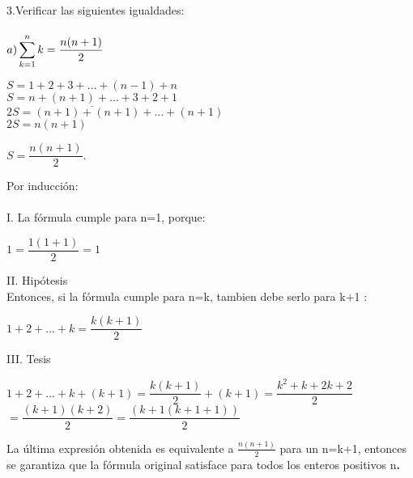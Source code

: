 \documentclass[12pt,a4paper,scrartcl]{article}
\begin{document}
{\newpage
3.Verificar las siguientes igualdades:\\
\\
$
\displaystyle
a)  \sum_{k=1}^{n}k = \dfrac{n(n+1)}{2} \\
$
\begin{center}
$S=1+2+3+\ldots+(n-1)+n$\\$\underline{S=n+(n+1)+\ldots+3+2+1}$\\$2S=(n+1)+(n+1)+\ldots+(n+1)$\\\vspace{1em}
$2S=n(n+1)$\\\vspace{1em}
\begin{center}
$S=\dfrac{n(n+1)}{2}\textbf{.}$
\end{center}
\end{center}Por inducci\'on:\\
\\I. La f\'ormula cumple para n=1, porque:\\
\begin{center}
$1=\dfrac{1(1+1)}{2}=1$
\end{center}
II. Hip\'otesis\\Entonces, si la f\'ormula cumple para n=k, tambien debe serlo para k+1 :
\begin{center}
$1+2+\ldots+k=\dfrac{k(k+1)}{2}$\\
\end{center}
III. Tesis\\
\begin{center}
$1+2+\ldots+k+(k+1) = \dfrac{k(k+1)}{2}+(k+1) = \dfrac{k^2+k+2k+2}{2}$\\\vspace{1em}$=\dfrac{(k+1)(k+2)}{2} = \dfrac{(k+1(k+1+1))}{2}$
\end{center}
La \'ultima expresi\'on obtenida es equivalente a $\frac{n(n+1)}{2}$  para un n=k+1, entonces se garantiza que la f\'ormula original satisface para todos los enteros positivos n\textbf{.}




}
\end{document}
